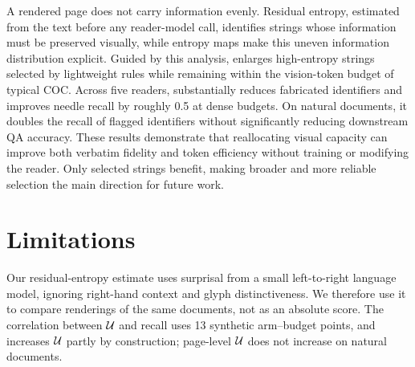 A rendered page does not carry information evenly. Residual entropy, estimated from the text before any reader-model call, identifies strings whose information must be preserved visually, while entropy maps make this uneven information distribution explicit. Guided by this analysis, \name enlarges high-entropy strings selected by lightweight rules while remaining within the vision-token budget of typical COC. Across five readers, \name substantially reduces fabricated identifiers and improves needle recall by roughly 0.5 at dense budgets. On natural documents, it doubles the recall of flagged identifiers without significantly reducing downstream QA accuracy. These results demonstrate that reallocating visual capacity can improve both verbatim fidelity and token efficiency without training or modifying the reader. Only selected strings benefit, making broader and more reliable selection the main direction for future work.

\section{Limitations}



Our residual-entropy estimate uses surprisal from a small left-to-right language model, ignoring right-hand context and glyph distinctiveness. We therefore use it to compare renderings of the same documents, not as an absolute score. The correlation between $\mathcal{U}$ and recall uses 13 synthetic arm--budget points, and \name increases $\mathcal{U}$ partly by construction; page-level $\mathcal{U}$ does not increase on natural documents.

